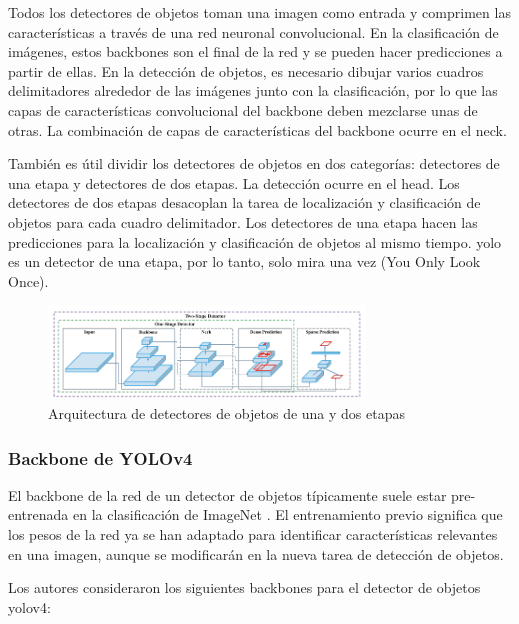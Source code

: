 Todos los detectores de objetos toman una imagen como entrada y comprimen las características a través de una red neuronal convolucional. En la clasificación de imágenes, estos backbones son el final de la red y se pueden hacer predicciones a partir de ellas. En la detección de objetos, es necesario dibujar varios cuadros delimitadores alrededor de las imágenes junto con la clasificación, por lo que las capas de características convolucional del backbone deben mezclarse unas de otras. La combinación de capas de características del backbone ocurre en el neck.

También es útil dividir los detectores de objetos en dos categorías: detectores de una etapa y detectores de dos etapas. La detección ocurre en el head. Los detectores de dos etapas desacoplan la tarea de localización y clasificación de objetos para cada cuadro delimitador. Los detectores de una etapa hacen las predicciones para la localización y clasificación de objetos al mismo tiempo. \gls{yolo} es un detector de una etapa, por lo tanto, solo mira una vez (You Only Look Once).

\begin{figure}[ht]
\centering
\includegraphics[width=0.75\textwidth]{img/chapters/estado-del-arte/one-two-stage-detector.png}
\caption{\label{fig:one-two-stage-detector}Arquitectura de detectores de objetos de una y dos etapas \cite{bochkovskiy2020yolov4}}
\end{figure}

\subsubsection*{Backbone de YOLOv4}
\label{subsubsec:yolov4-backbone}

El backbone de la red de un detector de objetos típicamente suele estar pre-entrenada en la clasificación de ImageNet \cite{russakovsky2015imagenet}. El entrenamiento previo significa que los pesos de la red ya se han adaptado para identificar características relevantes en una imagen, aunque se modificarán en la nueva tarea de detección de objetos.

Los autores consideraron los siguientes backbones para el detector de objetos \gls{yolov4}:

